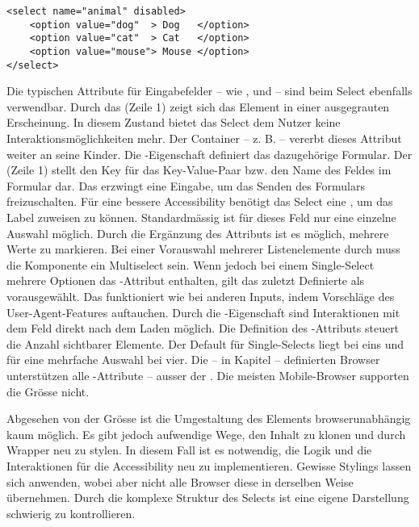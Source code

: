 \begin{lstlisting}[style = htmlcssjs, caption = Beispiel – Select, label = code:selectExample]
<select name="animal" disabled>
    <option value="dog"  > Dog   </option>
    <option value="cat"  > Cat   </option>
    <option value="mouse"> Mouse </option>
</select>
\end{lstlisting}

Die typischen Attribute für Eingabefelder – wie ,  und  – sind beim Select ebenfalls verwendbar. 
Durch das  (Zeile 1) zeigt sich das Element in einer ausgegrauten Erscheinung. 
In diesem Zustand bietet das Select dem Nutzer keine Interaktionsmöglichkeiten mehr. 
Der Container – z. B.  – vererbt dieses Attribut weiter an seine Kinder. 
Die -Eigenschaft definiert das dazugehörige Formular. 
Der  (Zeile 1) stellt den Key für das Key-Value-Paar bzw. den Name des Feldes im Formular dar. 
Das  erzwingt eine Eingabe, um das Senden des Formulars freizuschalten. 
Für eine bessere Accessibility benötigt das Select eine , um das Label zuweisen zu können. 
Standardmässig ist für dieses Feld nur eine einzelne Auswahl möglich. 
Durch die Ergänzung des Attributs  ist es möglich, mehrere Werte zu markieren. 
Bei einer Vorauswahl mehrerer Listenelemente durch  muss die Komponente ein Multiselect sein. 
Wenn jedoch bei einem Single-Select mehrere Optionen das -Attribut enthalten, gilt das zuletzt Definierte als vorausgewählt.
Das  funktioniert wie bei anderen Inputs, indem Vorschläge des User-Agent-Features auftauchen. 
Durch die -Eigenschaft sind Interaktionen mit dem Feld direkt nach dem Laden möglich. 
Die Definition des -Attributs steuert die Anzahl sichtbarer Elemente. 
Der Default für Single-Selects liegt bei eins und für eine mehrfache Auswahl bei vier. 
Die – in Kapitel \textbf{} – definierten Browser unterstützen alle -Attribute – ausser der .
Die meisten Mobile-Browser supporten die Grösse nicht. 

Abgesehen von der Grösse ist die Umgestaltung des Elements browserunabhängig kaum möglich. 
Es gibt jedoch aufwendige Wege, den Inhalt zu klonen und durch Wrapper neu zu stylen. 
In diesem Fall ist es notwendig, die Logik und die Interaktionen für die Accessibility neu zu implementieren. 
Gewisse Stylings lassen sich anwenden, wobei aber nicht alle Browser diese in derselben Weise übernehmen. 
Durch die komplexe Struktur des Selects ist eine eigene Darstellung schwierig zu kontrollieren. 

